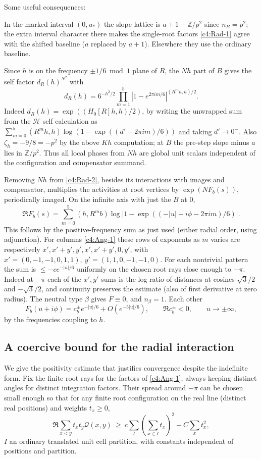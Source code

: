 Some useful consequences:
\par\noindent\textbullet\quad In the marked interval \((0,u_*)\) the slope lattice is \(a+1+\mathbb Z/p^2\) since \(n_B=p^2\); the extra interval character there makes the single-root factors \eqref{c4:Rad-1} agree with the shifted baseline (\(a\) replaced by \(a+1\)). Elsewhere they use the ordinary baseline.
\par\noindent\textbullet\quad Since \(h\) is on the frequency \(\pm1/6\bmod1\) plane of \(R\), the \(Nh\) part of \(B\) gives the self factor \(d_R(h)^{N^2}\) with
\[
 d_R(h)=6^{-h^2/2}\prod_{m=1}^5|1-e^{2\pi i m/6}|^{(R^m h,h)/2}.
\]
Indeed \(d_R(h)=\exp((H_0[R]h,h)/2)\), by writing the unwrapped sum from the \(\mathcal H\) self calculation as \(\sum_{m=0}^5(R^m h,h)\log(1-\exp((d'-2\pi i m)/6))\) and taking \(d'\to0^-\). Also \(\zeta_h=-9/8=-p^2\) by the above \(Kh\) computation; at \(B\) the pre-step slope minus \(a\) lies in \(\mathbb Z/p^2\). Thus all local phases from \(Nh\) are global unit scalars independent of the configuration and compensator summand.
\par\noindent\textbullet\quad Removing \(Nh\) from \eqref{c4:Rad-2}, besides its interactions with images and compensator, multiplies the activities at root vertices by \(\exp(N F_b(s))\), periodically imaged. On the infinite axis with just the \(B\) at 0,
\[
 \Re F_b(s)=\sum_{m=0}^5(h,R^m b)\log|1-\exp((-|u|+i\phi-2\pi i m)/6)|.
\]
This follows by the positive-frequency sum as just used (either radial order, using adjunction). For columns \eqref{c4:Ang-1} these rows of exponents as \(m\) varies are respectively \(x',x'+y',y',x',x'+y',0,y'\), with \(x'=(0,-1,-1,0,1,1),\ y'=(1,1,0,-1,-1,0)\). For each nontrivial pattern the sum is \(\le-c e^{-|u|/6}\) uniformly on the chosen root rays close enough to \(-\pi\). Indeed at \(-\pi\) each of the \(x',y'\) sums is the log ratio of distances at cosines \(\sqrt{3}/2\) and \(-\sqrt{3}/2\), and continuity preserves the estimate (also of first derivative at zero radius). The neutral type \(\beta\) gives \(F\equiv0\), and \(n_\beta=1\). Each other
\[
 F_b(u+i\phi)=c_b^\pm e^{-|u|/6}+O(e^{-5|u|/6}),\qquad \Re c_b^\pm<0,\qquad u\to\pm\infty ,
\]
by the frequencies coupling to \(h\).

\subsection{A coercive bound for the radial interaction}
\label{c4:radial-coercivity}

We give the positivity estimate that justifies convergence despite the indefinite form. Fix the finite root rays for the factors of \eqref{c4:Ang-1}, always keeping distinct angles for distinct integration factors. Their spread around \(-\pi\) can be chosen small enough so that for any finite root configuration on the real line (distinct real positions) and weights \(t_x\ge0\),
\begin{equation}
 \Re\sum_{x<y}t_x t_y\mathcal Q(x,y)\ \ge\
       c\sum_I\left(\sum_{x\in I}t_x\right)^2-C\sum_x t_x^2,                     \label{c4:Rad-3}
\end{equation}
\(I\) an ordinary translated unit cell partition, with constants independent of positions and partition.

